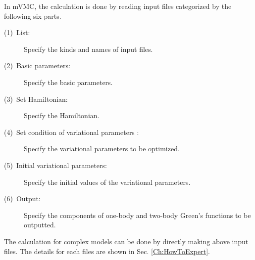 In mVMC, the calculation is done by reading input files categorized by the following six parts. 
\begin{description}
\item[(1)~List:] Specify the kinds and names of input files. 
\item[(2)~Basic parameters:] Specify the basic parameters.
\item[(3)~Set Hamiltonian:] Specify the Hamiltonian.
\item[(4)~Set condition of variational parameters :] Specify the variational parameters to be optimized.
\item[(5)~Initial variational parameters:] Specify the initial values of the variational parameters.
\item[(6)~Output:] Specify the components of one-body and two-body Green's functions to be outputted.
\end{description}

The calculation for complex models can be done by directly making above input files. 
The details for each files are shown in Sec. \ref{Ch:HowToExpert}.
